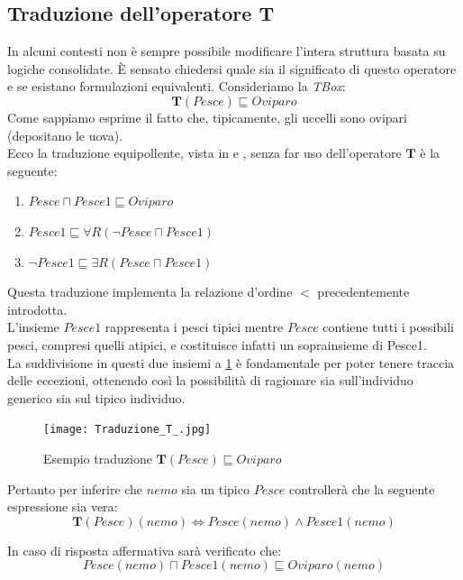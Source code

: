 \subsection{Traduzione dell'operatore T} \label{subSec: Traduzione T}
In alcuni contesti non è sempre possibile modificare l'intera struttura basata su logiche consolidate.
È sensato chiedersi quale sia il significato di questo operatore e se esistano formulazioni equivalenti.
Consideriamo la \textit{TBox}:
\[ \mathbf{T}(Pesce) \sqsubseteq Oviparo \]
Come sappiamo esprime il fatto che, tipicamente, gli uccelli sono ovipari (depositano le uova). \\
Ecco la traduzione equipollente, vista in \cite{PEAR} e \cite{COCOS}, senza far uso dell'operatore $ \mathbf{T} $ è la seguente: 
\begin{enumerate}\label{enu:elencoCond}
	\item $ Pesce \sqcap Pesce1 \sqsubseteq Oviparo $
	\item $ Pesce1 \sqsubseteq \forall R(\neg Pesce \sqcap Pesce1) $
	\item $ \neg Pesce1 \sqsubseteq \exists R(Pesce \sqcap Pesce1) $
\end{enumerate} 
Questa traduzione implementa la relazione d'ordine $ < $ precedentemente introdotta.\\
L'insieme $ Pesce1 $ rappresenta i pesci tipici mentre $ Pesce $ contiene tutti i possibili pesci, 
compresi quelli atipici, e costituisce infatti un soprainsieme di Pesce1. \\ 
La suddivisione in questi due insiemi a \ref{fig:tradPesce} è fondamentale per poter tenere traccia delle eccezioni, ottenendo così la possibilità di ragionare sia sull'individuo generico sia sul tipico individuo.\\
\begin{figure}[h]
	\texttt{[image: Traduzione\_T\_.jpg]}
	\centering
	\caption{Esempio traduzione $ \mathbf{T}(Pesce) \sqsubseteq Oviparo $}
	\label{fig:tradPesce}
\end{figure}
Pertanto per inferire che $ nemo $ sia un tipico $ Pesce $ controllerà che la seguente espressione sia vera:
\[ \mathbf{T}(Pesce)(nemo) \iff Pesce(nemo) \land Pesce1(nemo) \]

In caso di risposta affermativa sarà verificato che: 
\[ Pesce(nemo) \sqcap Pesce1(nemo) \sqsubseteq Oviparo(nemo) \]

